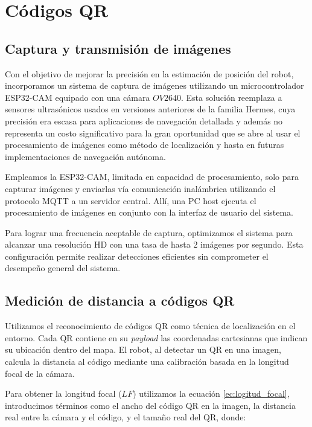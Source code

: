 \section{Códigos QR}

\subsection{Captura y transmisión de imágenes}

Con el objetivo de mejorar la precisión en la estimación de posición del robot, incorporamos un sistema de captura de imágenes utilizando un microcontrolador ESP32-CAM equipado con una cámara $OV2640$. Esta solución reemplaza a sensores ultrasónicos usados en versiones anteriores de la familia Hermes, cuya precisión era escasa para aplicaciones de navegación detallada y además no representa un costo significativo para la gran oportunidad que se abre al usar el procesamiento de imágenes como método de localización y hasta en futuras implementaciones de navegación autónoma. \cite{dey2018hands}

Empleamos la ESP32-CAM, limitada en capacidad de procesamiento, solo para capturar imágenes y enviarlas vía comunicación inalámbrica utilizando el protocolo MQTT a un servidor central. Allí, una PC host ejecuta el procesamiento de imágenes en conjunto con la interfaz de usuario del sistema.

Para lograr una frecuencia aceptable de captura, optimizamos el sistema para alcanzar una resolución HD con una tasa de hasta 2 imágenes por segundo. Esta configuración permite realizar detecciones eficientes sin comprometer el desempeño general del sistema.

\subsection{Medición de distancia a códigos QR}

Utilizamos el reconocimiento de códigos QR como técnica de localización en el entorno. Cada QR contiene en su \textit{payload} las coordenadas cartesianas que indican su ubicación dentro del mapa. El robot, al detectar un QR en una imagen, calcula la distancia al código mediante una calibración basada en la longitud focal de la cámara. \cite{wu2018size}

Para obtener la longitud focal ($LF$) utilizamos la ecuación \ref{ec:logitud_focal}, introducimos términos como el ancho del código QR en la imagen, la distancia real entre la cámara y el código, y el tamaño real del QR, donde:


